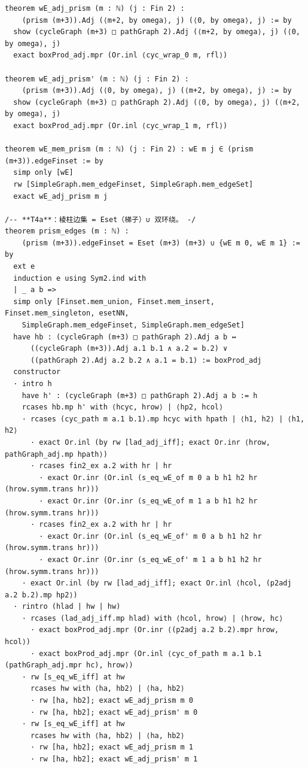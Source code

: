 \documentclass[11pt]{article}
\begin{document}
\begin{lstlisting}
theorem wE_adj_prism (m : ℕ) (j : Fin 2) :
    (prism (m+3)).Adj (⟨m+2, by omega⟩, j) (⟨0, by omega⟩, j) := by
  show (cycleGraph (m+3) □ pathGraph 2).Adj (⟨m+2, by omega⟩, j) (⟨0, by omega⟩, j)
  exact boxProd_adj.mpr (Or.inl ⟨cyc_wrap_0 m, rfl⟩)

theorem wE_adj_prism' (m : ℕ) (j : Fin 2) :
    (prism (m+3)).Adj (⟨0, by omega⟩, j) (⟨m+2, by omega⟩, j) := by
  show (cycleGraph (m+3) □ pathGraph 2).Adj (⟨0, by omega⟩, j) (⟨m+2, by omega⟩, j)
  exact boxProd_adj.mpr (Or.inl ⟨cyc_wrap_1 m, rfl⟩)

theorem wE_mem_prism (m : ℕ) (j : Fin 2) : wE m j ∈ (prism (m+3)).edgeFinset := by
  simp only [wE]
  rw [SimpleGraph.mem_edgeFinset, SimpleGraph.mem_edgeSet]
  exact wE_adj_prism m j

/-- **T4a**：棱柱边集 = Eset（梯子）∪ 双环绕。 -/
theorem prism_edges (m : ℕ) :
    (prism (m+3)).edgeFinset = Eset (m+3) (m+3) ∪ {wE m 0, wE m 1} := by
  ext e
  induction e using Sym2.ind with
  | _ a b =>
  simp only [Finset.mem_union, Finset.mem_insert, Finset.mem_singleton, esetNN,
    SimpleGraph.mem_edgeFinset, SimpleGraph.mem_edgeSet]
  have hb : (cycleGraph (m+3) □ pathGraph 2).Adj a b ↔
      ((cycleGraph (m+3)).Adj a.1 b.1 ∧ a.2 = b.2) ∨
      ((pathGraph 2).Adj a.2 b.2 ∧ a.1 = b.1) := boxProd_adj
  constructor
  · intro h
    have h' : (cycleGraph (m+3) □ pathGraph 2).Adj a b := h
    rcases hb.mp h' with ⟨hcyc, hrow⟩ | ⟨hp2, hcol⟩
    · rcases (cyc_path m a.1 b.1).mp hcyc with hpath | ⟨h1, h2⟩ | ⟨h1, h2⟩
      · exact Or.inl (by rw [lad_adj_iff]; exact Or.inr ⟨hrow, pathGraph_adj.mp hpath⟩)
      · rcases fin2_ex a.2 with hr | hr
        · exact Or.inr (Or.inl (s_eq_wE_of m 0 a b h1 h2 hr (hrow.symm.trans hr)))
        · exact Or.inr (Or.inr (s_eq_wE_of m 1 a b h1 h2 hr (hrow.symm.trans hr)))
      · rcases fin2_ex a.2 with hr | hr
        · exact Or.inr (Or.inl (s_eq_wE_of' m 0 a b h1 h2 hr (hrow.symm.trans hr)))
        · exact Or.inr (Or.inr (s_eq_wE_of' m 1 a b h1 h2 hr (hrow.symm.trans hr)))
    · exact Or.inl (by rw [lad_adj_iff]; exact Or.inl ⟨hcol, (p2adj a.2 b.2).mp hp2⟩)
  · rintro (hlad | hw | hw)
    · rcases (lad_adj_iff.mp hlad) with ⟨hcol, hrow⟩ | ⟨hrow, hc⟩
      · exact boxProd_adj.mpr (Or.inr ⟨(p2adj a.2 b.2).mpr hrow, hcol⟩)
      · exact boxProd_adj.mpr (Or.inl ⟨cyc_of_path m a.1 b.1 (pathGraph_adj.mpr hc), hrow⟩)
    · rw [s_eq_wE_iff] at hw
      rcases hw with ⟨ha, hb2⟩ | ⟨ha, hb2⟩
      · rw [ha, hb2]; exact wE_adj_prism m 0
      · rw [ha, hb2]; exact wE_adj_prism' m 0
    · rw [s_eq_wE_iff] at hw
      rcases hw with ⟨ha, hb2⟩ | ⟨ha, hb2⟩
      · rw [ha, hb2]; exact wE_adj_prism m 1
      · rw [ha, hb2]; exact wE_adj_prism' m 1


\end{lstlisting}
\end{document}
